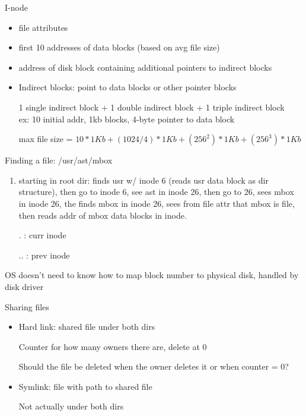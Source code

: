 \documentclass[11pt]{article}
\begin{document}
I-node
\begin{itemize}
    \item file attributes

    \item first 10 addresses of data blocks (based on avg file size)

    \item address of disk block containing additional pointers to indirect blocks

    \item Indirect blocks: point to data blocks or other pointer blocks

        1 single indirect block + 1 double indirect block + 1 triple indirect block \\

        ex: 10 initial addr, 1kb blocks, 4-byte pointer to data block

            max file size = $10*1Kb + (1024/4)*1Kb + (256^2)*1Kb + (256^3)*1Kb$
\end{itemize}

Finding a file: /usr/ast/mbox
\begin{enumerate}
    \item starting in root dir: finds usr w/ inode 6 (reads usr data block as dir structure),
        then go to inode 6, see ast in inode 26,
        then go to 26, sees mbox in inode 26, the finds mbox in inode 26, sees from file attr that
        mbox is file, then reads addr of mbox data blocks in inode.

        . : curr inode

        .. : prev inode

\end{enumerate}

OS doesn't need to know how to map block number to physical disk, handled by disk driver

Sharing files
\begin{itemize}
    \item Hard link: shared file under both dirs

        Counter for how many owners there are, delete at 0

        Should the file be deleted when the owner deletes it or when counter = 0?

    \item Symlink: file with path to shared file

        Not actually under both dirs
\end{itemize}
\end{document}

